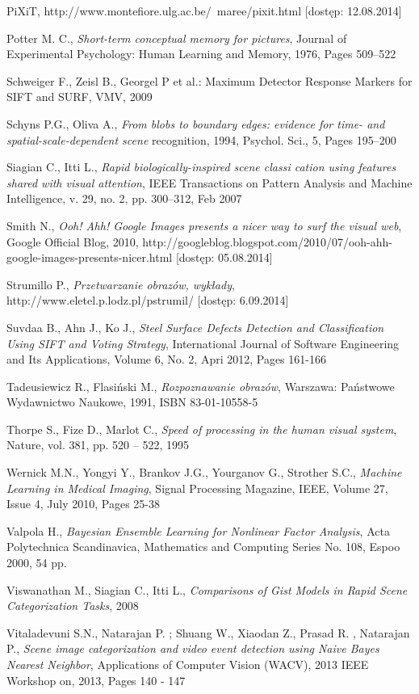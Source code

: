\begin{thebibliography}{100}
 PiXiT, http://www.montefiore.ulg.ac.be/~maree/pixit.html [dostęp: 12.08.2014]

 Potter M. C., \emph{Short-term conceptual memory for pictures}, Journal of Experimental Psychology: Human Learning and Memory, 1976, Pages 509–522

 Schweiger F., Zeisl B., Georgel P et al.: Maximum Detector Response Markers for SIFT and SURF, VMV, 
2009

 Schyns P.G., Oliva A., \emph{From blobs to boundary edges: evidence for time- and spatial-scale-dependent scene} recognition, 1994, Psychol. Sci., 5, Pages 195–200

 Siagian C., Itti L., \emph{Rapid biologically-inspired scene classi cation using features shared with visual attention}, IEEE Transactions on Pattern Analysis and Machine Intelligence, v. 29, no. 2, pp. 300–312, Feb 2007

 Smith N., \emph{Ooh! Ahh! Google Images presents a nicer way to surf the visual web}, Google Official Blog, 2010, http://googleblog.blogspot.com/2010/07/ooh-ahh-google-images-presents-nicer.html [dostęp: 05.08.2014]

 Strumillo P., \emph{Przetwarzanie obrazów, wykłady}, http://www.eletel.p.lodz.pl/pstrumil/ [dostęp: 6.09.2014]

 Suvdaa B., Ahn J., Ko J., \emph{Steel Surface Defects Detection and Classification Using SIFT and Voting Strategy}, International Journal of Software Engineering and Its Applications, Volume 6, No. 2, Apri 2012, Pages 161-166

 Tadeusiewicz R., Flasiński M., \emph{Rozpoznawanie obrazów}, Warszawa: Państwowe Wydawnictwo Naukowe, 1991, ISBN 83-01-10558-5

 Thorpe S., Fize D., Marlot C., \emph{Speed of processing in the human visual system}, Nature, vol. 381, pp. 520 – 522, 1995

 Wernick M.N., Yongyi Y., Brankov J.G., Yourganov G., Strother S.C., \emph{Machine Learning in Medical Imaging}, Signal Processing Magazine, IEEE, Volume 27,  Issue 4, July 2010, Pages 25-38

 Valpola H., \emph{Bayesian Ensemble Learning for Nonlinear Factor Analysis}, Acta Polytechnica Scandinavica, Mathematics and Computing Series No. 108, Espoo 2000, 54 pp.

  Viswanathan M., Siagian C., Itti L., \emph{Comparisons of Gist Models in Rapid Scene Categorization Tasks}, 2008

 Vitaladevuni S.N., Natarajan P. ; Shuang W., Xiaodan Z., Prasad R. , Natarajan P., \emph{Scene image categorization and video event detection using Naive Bayes Nearest Neighbor}, Applications of Computer Vision (WACV), 2013 IEEE Workshop on, 2013, Pages 140 - 147
 
\end{thebibliography} 